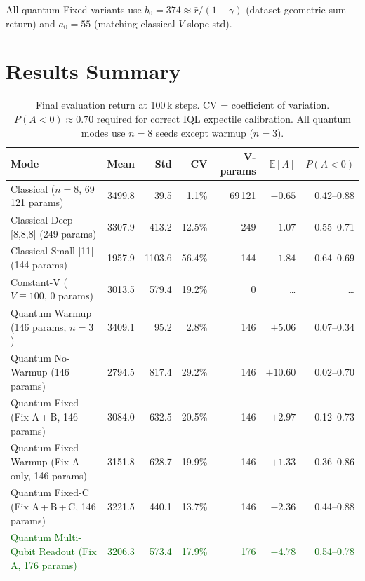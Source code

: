 \documentclass[10pt,a4paper]{article}
\begin{document}
All quantum Fixed variants use $b_0=374\approx\bar{r}/(1-\gamma)$ (dataset
geometric-sum return) and $a_0=55$ (matching classical $V$ slope std).

\section{Results Summary}

\begin{table}[h]
\centering
\caption{Final evaluation return at 100\,k steps. CV = coefficient of variation.
$P(A{<}0)\approx0.70$ required for correct IQL expectile calibration.
All quantum modes use $n=8$ seeds except warmup ($n=3$).}
\label{tab:returns}
\setlength{\tabcolsep}{4.5pt}
\begin{tabular}{lrrrrrr}
\toprule
\textbf{Mode} & \textbf{Mean} & \textbf{Std} & \textbf{CV} &
  \textbf{V-params} & $\mathbb{E}[A]$ & $P(A{<}0)$ \\
\midrule
Classical ($n=8$, 69\,121 params)
  & 3499.8 & 39.5  & 1.1\%  & 69\,121 & $-0.65$ & 0.42--0.88 \\
Classical-Deep [8,8,8] (249 params)
  & 3307.9 & 413.2 & 12.5\% & 249
  & $-1.07$ & 0.55--0.71 \\
Classical-Small [11] (144 params)
  & 1957.9 & 1103.6 & 56.4\% & 144
  & $-1.84$ & 0.64--0.69 \\
Constant-V ($V\equiv100$, 0 params)
  & 3013.5 & 579.4 & 19.2\% & 0
  & \ldots & \ldots \\
Quantum Warmup (146 params, $n{=}3$)
  & 3409.1 & 95.2  & 2.8\%  & 146
  & $+5.06$ & 0.07--0.34 \\
Quantum No-Warmup (146 params)
  & 2794.5 & 817.4 & 29.2\% & 146
  & $+10.60$ & 0.02--0.70 \\
Quantum Fixed (Fix A\,+\,B, 146 params)
  & 3084.0 & 632.5 & 20.5\% & 146
  & $+2.97$ & 0.12--0.73 \\
Quantum Fixed-Warmup (Fix A only, 146 params)
  & 3151.8 & 628.7 & 19.9\% & 146
  & $+1.33$ & 0.36--0.86 \\
Quantum Fixed-C (Fix A\,+\,B\,+\,C, 146 params)
  & 3221.5 & 440.1 & 13.7\% & 146
  & $-2.36$ & 0.44--0.88 \\
\textcolor{darkgreen}{Quantum Multi-Qubit Readout (Fix A, 176 params)}
  & \textcolor{darkgreen}{3206.3}
  & \textcolor{darkgreen}{573.4}
  & \textcolor{darkgreen}{17.9\%}
  & \textcolor{darkgreen}{176}
  & \textcolor{darkgreen}{$-4.78$}
  & \textcolor{darkgreen}{0.54--0.78} \\
\midrule
\end{tabular}
\end{table}
\end{document}
